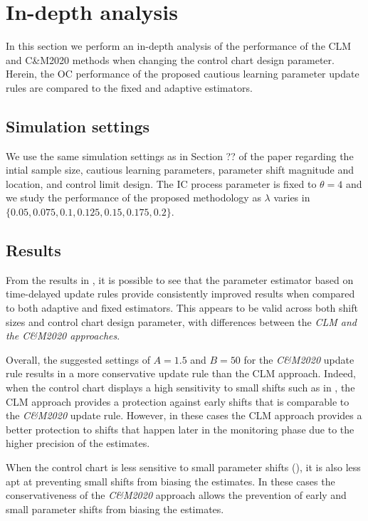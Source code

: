 \section{In-depth analysis}
In this section we perform an in-depth analysis of the performance of the CLM and C\&M2020 methods when changing the control chart design parameter.
Herein, the OC performance of the proposed cautious learning parameter update rules are compared to the fixed and adaptive estimators.

\subsection{Simulation settings}\label{ssec:Simulation settings}
We use the same simulation settings as in Section ?? of the paper regarding the intial sample size, cautious learning parameters, parameter shift magnitude and location, and control limit design.
The IC process parameter is fixed to $\theta = 4$ and we study the performance of the proposed methodology as $ \lambda$ varies in $\{0.05, 0.075, 0.1, 0.125, 0.15, 0.175, 0.2\} $.

\subsection{Results}\label{ssec:Results}
From the results in , it is possible to see that the parameter estimator based on time-delayed update rules provide consistently improved results when compared to both adaptive and fixed estimators.
This appears to be valid across both shift sizes and control chart design parameter, with differences between the \textit{CLM and the C\&M2020 approaches}.

Overall, the suggested settings of $ A=1.5$ and $ B=50$ for the \textit{C\&M2020} update rule results in a more conservative update rule than the CLM approach.
Indeed, when the control chart displays a high sensitivity to small shifts such as in , the CLM approach provides a protection against early shifts that is comparable to the \textit{C\&M2020} update rule.
However, in these cases the CLM approach provides a better protection to shifts that happen later in the monitoring phase due to the higher precision of the estimates.

When the control chart is less sensitive to small parameter shifts (), it is also less apt at preventing small shifts from biasing the estimates.
In these cases the conservativeness of the \textit{C\&M2020} approach allows the prevention of early and small parameter shifts from biasing the estimates.

